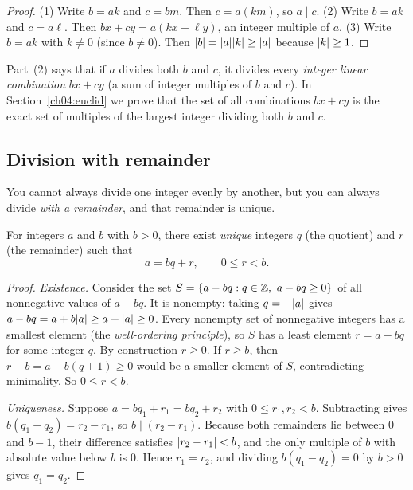 \begin{proof}
(1) Write $b = ak$ and $c = bm$. Then $c = a(km)$, so $a \mid c$.
(2) Write $b = ak$ and $c = a\ell$. Then $bx + cy = a(kx + \ell y)$, an integer multiple of $a$.
(3) Write $b = ak$ with $k \neq 0$ (since $b \neq 0$). Then $\lvert b\rvert = \lvert a\rvert\lvert k\rvert \ge \lvert a\rvert$
because $\lvert k\rvert \ge 1$.
\end{proof}

Part~(2) says that if $a$ divides both $b$ and $c$, it divides every \emph{integer linear combination}
$bx + cy$ (a sum of integer multiples of $b$ and $c$). In Section~\ref{ch04:euclid} we prove that
the set of all combinations $bx + cy$ is the exact set of multiples of the largest integer dividing
both $b$ and $c$.

\subsection*{Division with remainder}

You cannot always divide one integer evenly by another, but you can always divide \emph{with a
remainder}, and that remainder is unique.

\begin{theorem}
\label{ch04:thm-division}
For integers $a$ and $b$ with $b > 0$, there exist \emph{unique} integers $q$ (the quotient) and
$r$ (the remainder) such that
\[
  a = bq + r, \qquad 0 \le r < b.
\]
\end{theorem}

\begin{proof}
\emph{Existence.} Consider the set $S = \{a - bq : q \in \mathbb{Z},\ a - bq \ge 0\}$ of all nonnegative
values of $a - bq$. It is nonempty: taking $q = -\lvert a\rvert$ gives
$a - bq = a + b\lvert a\rvert \ge a + \lvert a\rvert \ge 0$. Every nonempty set of nonnegative integers has a
smallest element (the \emph{well-ordering principle}), so $S$ has a least element $r = a - bq$ for
some integer $q$. By construction $r \ge 0$. If $r \ge b$, then $r - b = a - b(q+1) \ge 0$ would be
a smaller element of $S$, contradicting minimality. So $0 \le r < b$.

\emph{Uniqueness.} Suppose $a = bq_1 + r_1 = bq_2 + r_2$ with $0 \le r_1, r_2 < b$.
Subtracting gives $b(q_1 - q_2) = r_2 - r_1$, so $b \mid (r_2 - r_1)$. Because both remainders lie
between $0$ and $b - 1$, their difference satisfies $\lvert r_2 - r_1\rvert < b$, and the only multiple of
$b$ with absolute value below $b$ is $0$. Hence $r_1 = r_2$, and dividing $b(q_1 - q_2) = 0$ by
$b > 0$ gives $q_1 = q_2$.
\end{proof}

